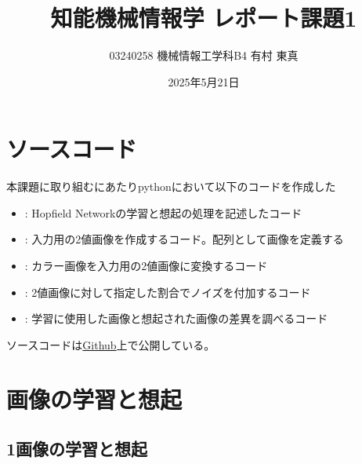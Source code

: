 \documentclass{ltjsarticle}
\title{知能機械情報学 レポート課題1}
\author{03240258 機械情報工学科B4 有村 東真}
\date{2025年5月21日}
\begin{document}
\maketitle
\newpage

\setcounter{tocdepth}{3}
\tableofcontents %

\newpage
\section{ソースコード}
本課題に取り組むにあたりpythonにおいて以下のコードを作成した
\begin{itemize}
  \item {}: Hopfield Networkの学習と想起の処理を記述したコード
  \item {}: 入力用の2値画像を作成するコード。配列として画像を定義する
  \item {}: カラー画像を入力用の2値画像に変換するコード
  \item {}: 2値画像に対して指定した割合でノイズを付加するコード
  \item {}: 学習に使用した画像と想起された画像の差異を調べるコード
\end{itemize}
ソースコードは\href{https://github.com/ankorom0tim0ti/HopfieldNetwork}{Github}上で公開している。
\section{画像の学習と想起}
\subsection{1画像の学習と想起}
\end{document}
